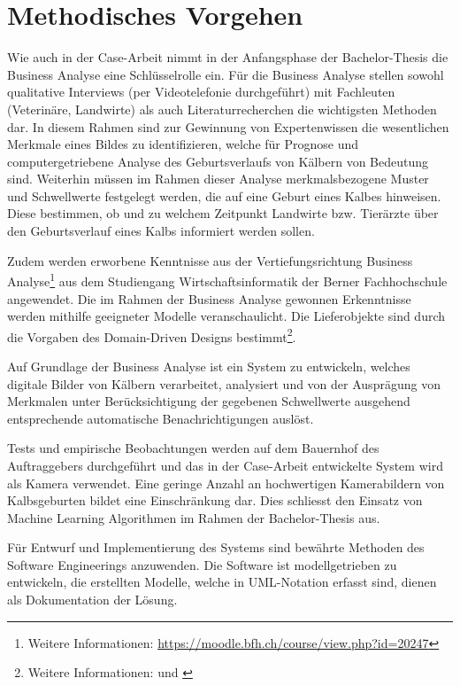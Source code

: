 \chapter{Methodisches Vorgehen}

Wie auch in der Case-Arbeit nimmt in der Anfangsphase der Bachelor-Thesis die Business Analyse eine Schlüsselrolle ein. Für die Business Analyse stellen sowohl qualitative Interviews (per Videotelefonie durchgeführt) mit Fachleuten (Veterinäre, Landwirte) als auch Literaturrecherchen die wichtigsten Methoden dar. In diesem Rahmen sind zur Gewinnung von Expertenwissen die wesentlichen Merkmale eines Bildes zu identifizieren, welche für Prognose und computergetriebene Analyse des Geburtsverlaufs von Kälbern von Bedeutung sind.  Weiterhin müssen im Rahmen dieser Analyse merkmalsbezogene Muster und Schwellwerte festgelegt werden, die auf eine Geburt eines Kalbes hinweisen. Diese bestimmen, ob und zu welchem Zeitpunkt Landwirte bzw. Tierärzte über den Geburtsverlauf eines Kalbs informiert werden sollen. 

Zudem werden erworbene Kenntnisse aus der Vertiefungsrichtung Business Analyse\footnote{Weitere Informationen: \url{https://moodle.bfh.ch/course/view.php?id=20247}} aus dem Studiengang Wirtschaftsinformatik der Berner Fachhochschule angewendet.  Die im Rahmen der Business Analyse gewonnen Erkenntnisse werden mithilfe geeigneter Modelle veranschaulicht. Die Lieferobjekte sind durch die Vorgaben des Domain-Driven Designs bestimmt\footnote{Weitere Informationen: \citep{Evans2015} und \citep{Vernon2016}}. 

Auf Grundlage der Business Analyse ist ein System zu entwickeln, welches digitale Bilder von Kälbern verarbeitet, analysiert und von der Ausprägung von Merkmalen unter Berücksichtigung der gegebenen Schwellwerte ausgehend entsprechende automatische Benachrichtigungen auslöst. 

Tests und empirische Beobachtungen werden auf dem Bauernhof des Auftraggebers durchgeführt und das in der Case-Arbeit entwickelte System wird als Kamera verwendet. Eine geringe Anzahl an hochwertigen Kamerabildern von Kalbsgeburten bildet eine Einschränkung dar. Dies schliesst den Einsatz von Machine Learning Algorithmen im Rahmen der Bachelor-Thesis aus.

Für Entwurf und Implementierung des Systems sind bewährte Methoden des Software Engineerings anzuwenden. Die Software ist modellgetrieben zu entwickeln, die erstellten Modelle, welche in UML-Notation erfasst sind, dienen als Dokumentation der Lösung.

